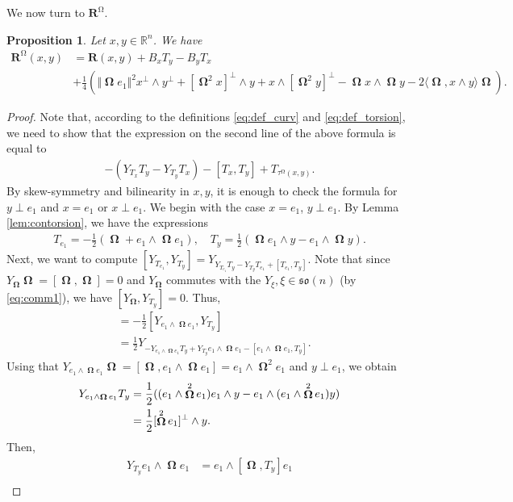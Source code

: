 \documentclass[12pt]{amsart}
\numberwithin{numbering}{section}
\theoremstyle{plain}
\newtheorem{pps}[numbering]{Proposition}
\theoremstyle{definition}
\theoremstyle{remark}
\numberwithin{equation}{section}
\DeclareMathOperator{\oo}{\mathbf{\Omega}}
\DeclareMathOperator{\mg}{\Omega}
\newcommand{\rfm}{\mathbf{R}}
\newcommand{\rsfm}{\mathbf{R}^{\mg}}
\newcommand{\con}[1]{T_{#1}}
\newcommand{\R}{\mathbb{R}}
\newcommand{\frk}[1]{\mathfrak{#1}}
\begin{document}
We now turn to $\rsfm$.
\begin{pps} \label{pps:curvature}
Let $x, y \in \R^n$. We have 
\begin{align*}
\rsfm(x, y) &= \rfm(x, y) + B_x \con{y} - B_y \con{x} \\ 
&+ \frac{1}{4} (\Vert \oo e_1 \Vert^2 x^\perp \wedge y^\perp + [\oo^2 x]^\perp \wedge y + x \wedge [\oo^2 y]^\perp - \oo x \wedge \oo y - 2 \langle \oo, x \wedge y \rangle \oo). 
\end{align*}
\end{pps}
\begin{proof} Note that, according to the definitions \eqref{eq:def_curv} and \eqref{eq:def_torsion}, we need to show that the expression on the second line of the above formula is equal to 
\begin{align*}
- (Y_{T_x} T_y - Y_{T_y} T_x) - [T_x, T_y] + T_{\tau^{\mg}(x, y)}.
\end{align*}
By skew-symmetry and bilinearity in $x, y$, it is enough to check the formula for $y \perp e_1$ and $x = e_1$ or $x \perp {e_1}$. We begin with the case $x = e_1$, $y \perp e_1$. By Lemma \ref{lem:contorsion}, we have the expressions 
\begin{align*}
T_{e_1} = - \frac{1}{2}(\oo + e_1 \wedge \oo e_1), \quad T_y = \frac{1}{2}(\oo e_1 \wedge y - e_1 \wedge \oo y).
\end{align*}
Next, we want to compute $[Y_{T_{e_1}}, Y_{T_y}] = Y_{Y_{T_{e_1}} T_y - Y_{T_y} T_{e_1} + [T_{e_1}, T_y]}$. Note that since $Y_{\oo} \oo = [\oo, \oo] = 0$ and $Y_{\oo}$ commutes with the $Y_\xi, \xi \in \frk{so}(n)$ (by \eqref{eq:comm1}), we have $[Y_{\oo}, Y_{T_y}] = 0$. Thus, 
\begin{align*}
[Y_{T_{e_1}}, Y_{T_y}] &= - \frac{1}{2} [Y_{e_1 \wedge \oo e_1}, Y_{T_y}] \\ 
&= \frac{1}{2} Y_{- Y_{e_1 \wedge \oo e_1} T_y + Y_{T_y} e_1 \wedge \oo e_1 - [e_1 \wedge \oo e_1, T_y]}.
\end{align*}
Using that $Y_{e_1 \wedge \oo e_1} \oo = [\oo, e_1 \wedge \oo e_1] = e_1 \wedge \oo^2 e_1$ and $y \perp e_1$, we obtain
\begin{align} \label{eq:bracket00}
Y_{e_1 \wedge \oo e_1} T_y 
&= \frac{1}{2} ((e_1 \wedge \oo^2 e_1) e_1  \wedge y - e_1 \wedge (e_1 \wedge \oo^2 e_1) y) \\ 
&= \frac{1}{2} [\oo^2 e_1]^\perp \wedge y. \notag
\end{align} 
Then,
\begin{align} \label{eq:bracket01}
Y_{T_y} e_1 \wedge \oo e_1 &= e_1 \wedge [\oo, T_y] e_1 \\ 

\end{align}
\end{proof}
\end{document}
